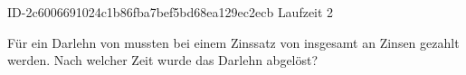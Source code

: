 \begin{exercise}
      {ID-2c6006691024c1b86fba7bef5bd68ea129ec2ecb}
      {Laufzeit 2}
  \ifproblem\problem\par
    Für ein Darlehn von  mussten bei einem Zinssatz von 
    insgesamt  an Zinsen gezahlt werden. Nach welcher Zeit wurde
    das Darlehn abgelöst?
  \fi
\end{exercise}
